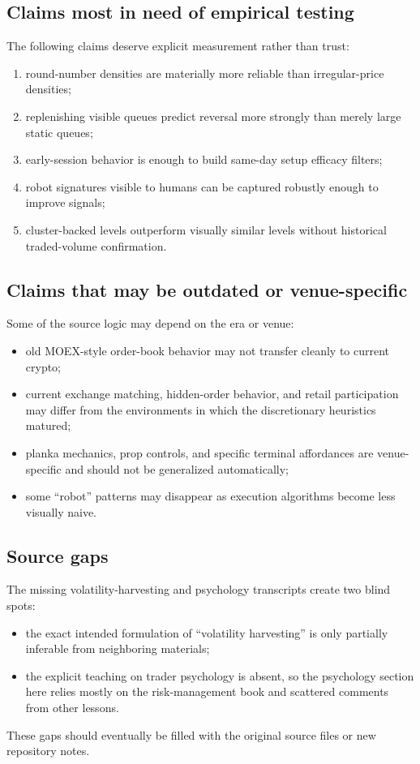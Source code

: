 \subsection{Claims most in need of empirical testing}

The following claims deserve explicit measurement rather than trust:

\begin{enumerate}[leftmargin=1.5em]
\item round-number densities are materially more reliable than irregular-price densities;
\item replenishing visible queues predict reversal more strongly than merely large static queues;
\item early-session behavior is enough to build same-day setup efficacy filters;
\item robot signatures visible to humans can be captured robustly enough to improve signals;
\item cluster-backed levels outperform visually similar levels without historical traded-volume confirmation.
\end{enumerate}

\subsection{Claims that may be outdated or venue-specific}

Some of the source logic may depend on the era or venue:

\begin{itemize}[leftmargin=1.5em]
\item old MOEX-style order-book behavior may not transfer cleanly to current crypto;
\item current exchange matching, hidden-order behavior, and retail participation may differ from the environments in which the discretionary heuristics matured;
\item planka mechanics, prop controls, and specific terminal affordances are venue-specific and should not be generalized automatically;
\item some ``robot'' patterns may disappear as execution algorithms become less visually naive.
\end{itemize}

\subsection{Source gaps}

The missing volatility-harvesting and psychology transcripts create two blind spots:

\begin{itemize}[leftmargin=1.5em]
\item the exact intended formulation of ``volatility harvesting'' is only partially inferable from neighboring materials;
\item the explicit teaching on trader psychology is absent, so the psychology section here relies mostly on the risk-management book and scattered comments from other lessons.
\end{itemize}

These gaps should eventually be filled with the original source files or new repository notes.
